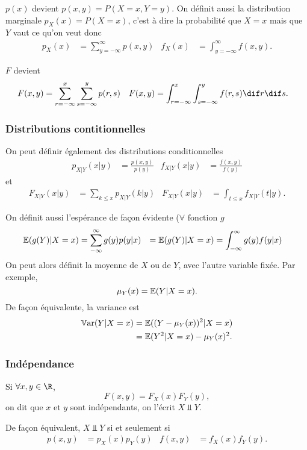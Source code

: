 $p(x)$ devient $p(x, y) = P(X = x, Y = y)$.
On définit aussi la distribution marginale $p_X(x) = P(X = x)$,
c'est à dire la probabilité que $X = x$ mais que $Y$ vaut ce qu'on veut
donc
\begin{align*}
  p_X(x) & = \sum_{y = -\infty}^{\infty} p(x, y) & f_X(x) & = \int_{y = -\infty}^{\infty} f(x, y).
\end{align*}

$F$ devient
\begin{align*}
  F(x, y) & = \sum_{r = -\infty}^{x} \sum_{s = -\infty}^{y} p(r, s) & F(x, y) & = \int_{r=-\infty}^{x} \int_{s=-\infty}^{y} f(r, s) \dif r \dif s.
\end{align*}

\subsubsection{Distributions contitionnelles}
On peut définir également des distributions conditionnelles
\begin{align*}
  p_{X|Y}(x|y) & = \frac{p(x, y)}{p(y)} & f_{X|Y}(x|y) & = \frac{f(x,y)}{f(y)}
\end{align*}
et
\begin{align*}
  F_{X|Y}(x|y) & = \sum_{k \leq x} p_{X|Y}(k|y) & F_{X|Y}(x|y) & = \int_{t \leq x} f_{X|Y}(t|y).
\end{align*}

On définit aussi l'espérance de façon évidente ($\forall \textrm{ fonction } g$
\begin{align*}
  \mathbb{E}(g(Y)|X=x) & = \sum_{-\infty}^\infty g(y) p(y|x) & = \mathbb{E}(g(Y)|X=x) & = \int_{-\infty}^\infty g(y) f(y|x)
\end{align*}
On peut alors définit la moyenne de $X$ ou de $Y$, avec l'autre variable fixée. Par exemple,
\[ \mu_Y(x) = \mathbb{E}(Y | X = x). \]
De façon équivalente, la variance est
\begin{align*}
  \operatorname{\mathbb{V}ar}(Y|X=x) & = \mathbb{E}((Y - \mu_Y(x))^2 | X = x)\\
              & = \mathbb{E}(Y^2|X = x) - \mu_Y(x)^2.
\end{align*}

\subsubsection{Indépendance}
Si $\forall x, y \in \R$,
\[ F(x, y) = F_X(x) F_Y(y), \]
on dit que $x$ et $y$ sont indépendants, on l'écrit $X \Perp Y$.

De façon équivalent, $X \Perp Y$ si et seulement si
\begin{align*}
  p(x, y) & = p_X(x) p_Y(y) & f(x, y) & = f_X(x) f_Y(y).
\end{align*}

